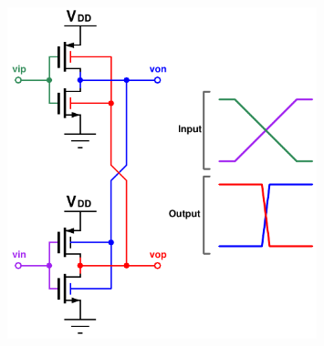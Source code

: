 			\begin{figure}[htb!]
			        \centering
			        \includegraphics[width=0.8\textwidth, angle=0]{./figs/pseudiff_buffer}
			\end{figure}


	\FloatBarrier
